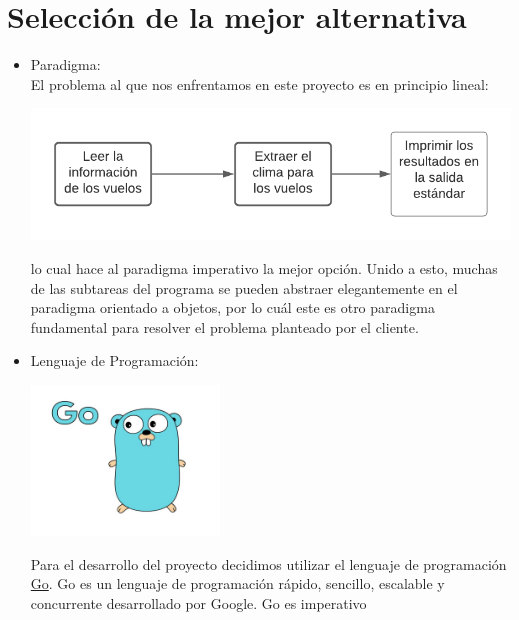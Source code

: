 \documentclass{report}
\begin{document}
\section*{Selección de la mejor alternativa}
\begin{itemize}
    \item Paradigma: \\
    El problema al que nos enfrentamos en este proyecto es en principio lineal: \\
    \begin{center}
    \includegraphics[width=15cm]{images/simple proccess.png}
    \end{center}
    lo cual hace al paradigma imperativo la mejor opción. Unido a esto, muchas de las subtareas del programa se pueden abstraer elegantemente en el paradigma orientado a objetos, por lo cuál este es otro paradigma fundamental para resolver el problema planteado por el cliente. \\
    \item Lenguaje de Programación: \\
    \begin{center}
        \includegraphics[width=5cm]{images/GOpher.jpg}
    \end{center}
    Para el desarrollo del proyecto decidimos utilizar el lenguaje de programación \href{https://golang.org}{Go}.
    Go es un lenguaje de programación rápido, sencillo, escalable y concurrente desarrollado por Google. Go es imperativo

\end{itemize}
\end{document}
